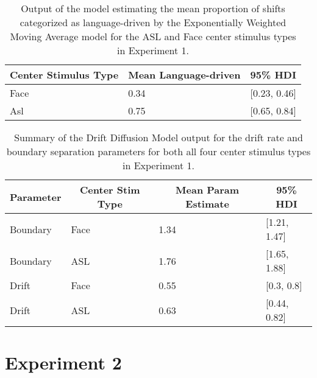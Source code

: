 \documentclass[,man,floatsintext]{apa6}
\begin{document}
\begin{appendix}
\begin{table}[h]
\begin{center}
\begin{threeparttable}
\caption{\label{tab:trio-guess-cuts}Output of the model estimating the mean proportion of shifts categorized as language-driven by the Exponentially Weighted Moving Average model for the ASL and Face center stimulus types in Experiment 1.}
\begin{tabular}{lll}
\toprule
Center Stimulus Type & \multicolumn{1}{c}{Mean Language-driven} & \multicolumn{1}{c}{95\% HDI}\\
\midrule
Face & 0.34 & [0.23, 0.46]\\
Asl & 0.75 & [0.65, 0.84]\\
\bottomrule
\end{tabular}
\end{threeparttable}
\end{center}
\end{table}

\begin{table}[h]
\begin{center}
\begin{threeparttable}
\caption{\label{tab:trio-hddm}Summary of the Drift Diffusion Model output for the drift rate and boundary separation parameters for both all four center stimulus types in Experiment 1.}
\begin{tabular}{llll}
\toprule
Parameter & \multicolumn{1}{c}{Center Stim Type} & \multicolumn{1}{c}{Mean Param Estimate} & \multicolumn{1}{c}{95\% HDI}\\
\midrule
Boundary & Face & 1.34 & [1.21, 1.47]\\
Boundary & ASL & 1.76 & [1.65, 1.88]\\
Drift & Face & 0.55 & [0.3, 0.8]\\
Drift & ASL & 0.63 & [0.44, 0.82]\\
\bottomrule
\end{tabular}
\end{threeparttable}
\end{center}
\end{table}

\section{Experiment 2}\label{experiment-2}


\end{appendix}
\end{document}
